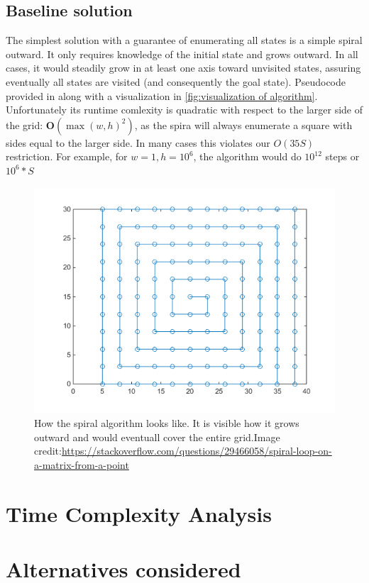\documentclass{article}
\begin{document}
\subsection*{Baseline solution}
The simplest solution with a guarantee of enumerating all states is a simple spiral outward. It only requires knowledge of the initial state and grows outward. In all cases, it would steadily grow in at least 
one axis toward unvisited states, assuring eventually all states are visited (and consequently the goal state). Pseudocode provided in along with a visualization in \autoref{fig:visualization of algorithm}. Unfortunately its runtime comlexity is 
quadratic with respect to the larger side of the grid: $\mathbf O(\max(w, h)^2)$, as the spira will always enumerate a square with sides equal to the larger side. In many cases this violates our 
$O(35S)$ restriction. For example, for $w=1, h = 10^6$, the algorithm would do $10^{12}$ steps or $10^6 * S$ 

\begin{figure}[H]
    \begin{center}
        \includegraphics[width=0.4\linewidth]{grid_spiral.png}
        \caption{How the spiral algorithm looks like. It is visible how it grows outward and would eventuall cover the entire grid.Image credit:\url{https://stackoverflow.com/questions/29466058/spiral-loop-on-a-matrix-from-a-point} }
    \end{center}
    \label{fig:visualization of algorithm}
\end{figure}

\section{Time Complexity Analysis}
\section{Alternatives considered}
\end{document}
